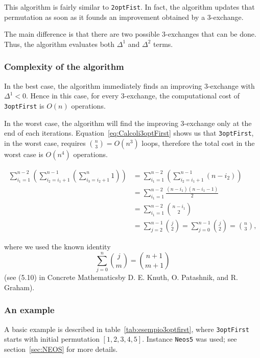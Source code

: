This algorithm is fairly similar to \texttt{2optFist}. In fact, the algorithm updates that permutation as soon as it founds an improvement obtained by a $3$-exchange.

The main difference is that there are two possible $3$-exchanges that can be done. Thus, the algorithm evaluates both $\Delta^1$ and $\Delta^2$ terms.

\subsubsection{Complexity of the algorithm}
In the best case, the algorithm immediately finds an improving $3$-exchange with $\Delta^1<0$. Hence in this case, for every $3$-exchange, the computational cost of \texttt{3optFirst} is $O(n)$ operations.

In the worst case, the algorithm will find the improving $3$-exchange only at the end of each iterations. 
Equation~\eqref{eq:Calcoli3optFirst} shows us that \texttt{3optFirst}, in the worst case,  requires $\binom{n}{3}=O(n^3)$ loops, therefore the total cost in the worst case is $O(n^4)$ operations.

\begin{equation}
\label{eq:Calcoli3optFirst}
\begin{split}
\sum_{i_1=1}^{n-2}\left(\sum_{i_2=i_1+1}^{n-1}\left(\sum_{i_3=i_2+1}^n 1\right)\right) 
&= \sum_{i_1=1}^{n-2}\left(\sum_{i_2=i_1+1}^{n-1} \left(n-i_2\right)\right) \\
&=\sum_{i_1=1}^{n-2}\frac{(n-i_1)(n-i_1-1)}{2}\\
&=\sum_{i_1=1}^{n-2}\binom{n-i_1}{2}\\
&=\sum_{j=2}^{n-1}\binom{j}{2}=\sum_{j=0}^{n-1}\binom{j}{2}=\binom{n}{3},
\end{split}
\end{equation}

\noindent where we used the known identity \[\sum_{j=0}^n\binom{j}{m}=\binom{n+1}{m+1}\]
(see (5.10) in Concrete Mathematicsby D. E. Knuth, O. Patashnik, and R. Graham).

\subsubsection{An example}

\noindent A basic example is described in table~\ref{tab:esempio3optfirst}, where \texttt{3optFirst} starts with initial permutation $[1,2,3,4,5]$. Instance \texttt{Neos5} was used; see section~\ref{sec:NEOS} for more details.


